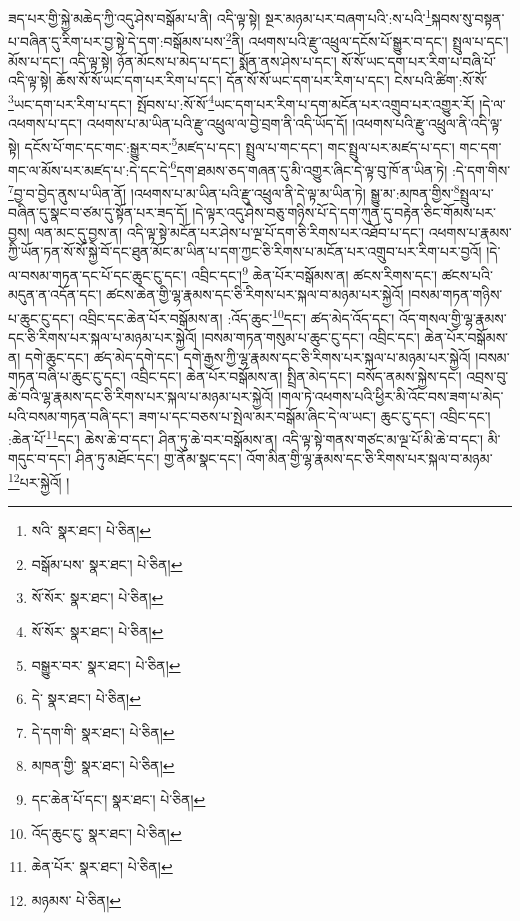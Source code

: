 ཟད་པར་གྱི་སྐྱེ་མཆེད་ཀྱི་འདུ་ཤེས་བསྒོམ་པ་ནི། འདི་ལྟ་སྟེ། སྔར་མཉམ་པར་བཞག་པའི་:ས་པའི་\footnote{སའི་  སྣར་ཐང་།  པེ་ཅིན། }སྐབས་སུ་བསྟན་པ་བཞིན་དུ་རིག་པར་བྱ་སྟེ་དེ་དག་:བསྒོམས་པས་\footnote{བསྒོམ་པས་  སྣར་ཐང་།  པེ་ཅིན། }ནི། འཕགས་པའི་རྫུ་འཕྲུལ་དངོས་པོ་སྒྱུར་བ་དང་། སྤྲུལ་པ་དང་། མོས་པ་དང་། འདི་ལྟ་སྟེ། ཉོན་མོངས་པ་མེད་པ་དང་། སྨོན་ནས་ཤེས་པ་དང་། སོ་སོ་ཡང་དག་པར་རིག་པ་བཞི་པོ་འདི་ལྟ་སྟེ། ཆོས་སོ་སོ་ཡང་དག་པར་རིག་པ་དང་། དོན་སོ་སོ་ཡང་དག་པར་རིག་པ་དང་། ངེས་པའི་ཚིག་:སོ་སོ་\footnote{སོ་སོར་  སྣར་ཐང་།  པེ་ཅིན། }ཡང་དག་པར་རིག་པ་དང་། སྤོབས་པ་:སོ་སོ་\footnote{སོ་སོར་  སྣར་ཐང་།  པེ་ཅིན། }ཡང་དག་པར་རིག་པ་དག་མངོན་པར་འགྲུབ་པར་འགྱུར་རོ། །དེ་ལ་འཕགས་པ་དང་། འཕགས་པ་མ་ཡིན་པའི་རྫུ་འཕྲུལ་ལ་བྱེ་བྲག་ནི་འདི་ཡོད་དོ། །འཕགས་པའི་རྫུ་འཕྲུལ་ནི་འདི་ལྟ་སྟེ། དངོས་པོ་གང་དང་གང་:སྒྱུར་བར་\footnote{བསྒྱུར་བར་  སྣར་ཐང་།  པེ་ཅིན། }མཛད་པ་དང་། སྤྲུལ་པ་གང་དང་། གང་སྤྲུལ་པར་མཛད་པ་དང་། གང་དག་གང་ལ་མོས་པར་མཛད་པ་:དེ་དང་དེ་\footnote{དེ་  སྣར་ཐང་།  པེ་ཅིན། }དག་ཐམས་ཅད་གཞན་དུ་མི་འགྱུར་ཞིང་དེ་ལྟ་བུ་ཁོ་ན་ཡིན་ཏེ། :དེ་དག་གིས་\footnote{དེ་དག་གི་  སྣར་ཐང་།  པེ་ཅིན། }བྱ་བ་བྱེད་ནུས་པ་ཡིན་ནོ། །འཕགས་པ་མ་ཡིན་པའི་རྫུ་འཕྲུལ་ནི་དེ་ལྟ་མ་ཡིན་ཏེ། སྒྱུ་མ་:མཁན་གྱིས་\footnote{མཁན་གྱི་  སྣར་ཐང་།  པེ་ཅིན། }སྤྲུལ་པ་བཞིན་དུ་སྣང་བ་ཙམ་དུ་སྟོན་པར་ཟད་དོ། །དེ་ལྟར་འདུ་ཤེས་བཅུ་གཉིས་པོ་དེ་དག་ཀུན་དུ་བརྟེན་ཅིང་གོམས་པར་བྱས། ལན་མང་དུ་བྱས་ན། འདི་ལྟ་སྟེ་མངོན་པར་ཤེས་པ་ལྔ་པོ་དག་ཅི་རིགས་པར་འཐོབ་པ་དང་། འཕགས་པ་རྣམས་ཀྱི་ཡོན་ཏན་སོ་སོ་སྐྱེ་བོ་དང་ཐུན་མོང་མ་ཡིན་པ་དག་ཀྱང་ཅི་རིགས་པ་མངོན་པར་འགྲུབ་པར་རིག་པར་བྱའོ། །དེ་ལ་བསམ་གཏན་དང་པོ་དང་ཆུང་ངུ་དང་། འབྲིང་དང་།\footnote{དང་ཆེན་པོ་དང་།  སྣར་ཐང་།  པེ་ཅིན། } ཆེན་པོར་བསྒོམས་ན། ཚངས་རིགས་དང་། ཚངས་པའི་མདུན་ན་འདོན་དང་། ཚངས་ཆེན་གྱི་ལྷ་རྣམས་དང་ཅི་རིགས་པར་སྐལ་བ་མཉམ་པར་སྐྱེའོ། །བསམ་གཏན་གཉིས་པ་ཆུང་ངུ་དང་། འབྲིང་དང་ཆེན་པོར་བསྒོམས་ན། :འོད་ཆུང་\footnote{འོད་ཆུང་ངུ་  སྣར་ཐང་།  པེ་ཅིན། }དང་། ཚད་མེད་འོད་དང་། འོད་གསལ་གྱི་ལྷ་རྣམས་དང་ཅི་རིགས་པར་སྐལ་པ་མཉམ་པར་སྐྱེའོ། །བསམ་གཏན་གསུམ་པ་ཆུང་ངུ་དང་། འབྲིང་དང་། ཆེན་པོར་བསྒོམས་ན། དགེ་ཆུང་དང་། ཚད་མེད་དགེ་དང་། དགེ་རྒྱས་ཀྱི་ལྷ་རྣམས་དང་ཅི་རིགས་པར་སྐལ་པ་མཉམ་པར་སྐྱེའོ། །བསམ་གཏན་བཞི་པ་ཆུང་ངུ་དང་། འབྲིང་དང་། ཆེན་པོར་བསྒོམས་ན། སྤྲིན་མེད་དང་། བསོད་ནམས་སྐྱེས་དང་། འབྲས་བུ་ཆེ་བའི་ལྷ་རྣམས་དང་ཅི་རིགས་པར་སྐལ་པ་མཉམ་པར་སྐྱེའོ། །གལ་ཏེ་འཕགས་པའི་ཕྱིར་མི་འོང་བས་ཟག་པ་མེད་པའི་བསམ་གཏན་བཞི་དང་། ཟག་པ་དང་བཅས་པ་སྤེལ་མར་བསྒོམ་ཞིང་དེ་ལ་ཡང་། ཆུང་ངུ་དང་། འབྲིང་དང་། :ཆེན་པོ་\footnote{ཆེན་པོར་  སྣར་ཐང་།  པེ་ཅིན། }དང་། ཆེས་ཆེ་བ་དང་། ཤིན་ཏུ་ཆེ་བར་བསྒོམས་ན། འདི་ལྟ་སྟེ་གནས་གཙང་མ་ལྔ་པོ་མི་ཆེ་བ་དང་། མི་གདུང་བ་དང་། ཤིན་ཏུ་མཐོང་དང་། གྱ་ནོམ་སྣང་དང་། འོག་མིན་གྱི་ལྷ་རྣམས་དང་ཅི་རིགས་པར་སྐལ་བ་མཉམ་\footnote{མཉམས་  པེ་ཅིན། }པར་སྐྱེའོ། །
